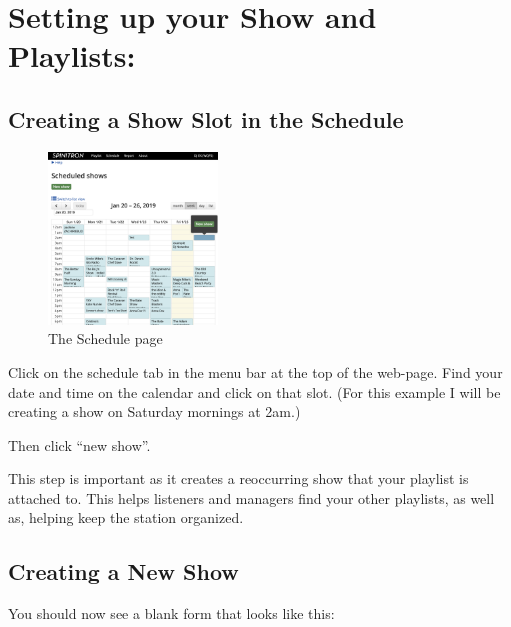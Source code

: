 \documentclass[12pt]{article}
\begin{document}
\clearpage
\newpage

\section{Setting up your Show and Playlists:}


\subsection{Creating a Show Slot in the Schedule}

\begin{figure}
    \includegraphics[width=0.4\textwidth]{images/Schedule.png}
    \caption{The Schedule page}
    \label{fig7}
\end{figure}

Click on the schedule tab in the menu bar at the top of the web-page.
Find your date and time on the calendar and click on that slot. (For this example I will be creating a show on Saturday mornings at 2am.)

Then click ``new show''.

\hrulefill

This step is important as it creates a reoccurring show that your playlist is attached to. This helps listeners and managers find your other playlists, as well as, helping keep the station organized.

\hrulefill

\vspace{1cm}

\subsection{Creating a New Show}

You should now see a blank form that looks like this:
\end{document}
